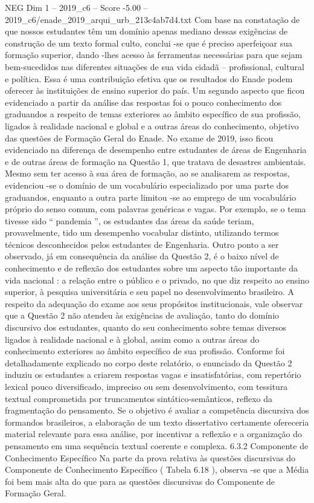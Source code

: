 \begin{textsample}{NEG Dim 1 – 2019\_c6 – Score -5.00 – 2019\_c6/enade\_2019\_arqui\_urb\_213c4ab7d4.txt}
Com base na constatação de que nossos estudantes têm um domínio apenas mediano dessas exigências de construção de um texto formal culto, conclui -se que é preciso aperfeiçoar sua formação superior, dando -lhes acesso às ferramentas necessárias para que sejam bem-sucedidos nas diferentes situações de sua vida cidadã – profissional, cultural e política.
Essa é uma contribuição efetiva que os resultados do Enade podem oferecer às instituições de ensino superior do país.
Um segundo aspecto que ficou evidenciado a partir da análise das respostas foi o pouco conhecimento dos graduandos a respeito de temas exteriores ao âmbito específico de sua profissão, ligados à realidade nacional e global e a outras áreas do conhecimento, objetivo das questões de Formação Geral do Enade.
No exame de 2019, isso ficou evidenciado na diferença de desempenho entre estudantes de áreas de Engenharia e de outras áreas de formação na Questão 1, que tratava de desastres ambientais.
Mesmo sem ter acesso à sua área de formação, ao se analisarem as respostas, evidenciou -se o domínio de um vocabulário especializado por uma parte dos graduandos, enquanto a outra parte limitou -se ao emprego de um vocabulário próprio do senso comum, com palavras genéricas e vagas.
Por exemplo, se o tema tivesse sido “ pandemia ”, os estudantes das áreas da saúde teriam, provavelmente, tido um desempenho vocabular distinto, utilizando termos técnicos desconhecidos pelos estudantes de Engenharia.
Outro ponto a ser observado, já em consequência da análise da Questão 2, é o baixo nível de conhecimento e de reflexão dos estudantes sobre um aspecto tão importante da vida nacional : a relação entre o público e o privado, no que diz respeito ao ensino superior, à pesquisa universitária e seu papel no desenvolvimento brasileiro.
A respeito da adequação do exame aos seus propósitos institucionais, vale observar que a Questão 2 não atendeu às exigências de avaliação, tanto do domínio discursivo dos estudantes, quanto do seu conhecimento sobre temas diversos ligados à realidade nacional e à global, assim como a outras áreas do conhecimento exteriores ao âmbito específico de sua profissão.
Conforme foi detalhadamente explicado no corpo deste relatório, o enunciado da Questão 2 induziu os estudantes a criarem respostas vagas e insatisfatórias, com repertório lexical pouco diversificado, impreciso ou sem desenvolvimento, com tessitura textual comprometida por truncamentos sintático-semânticos, reflexo da fragmentação do pensamento.
Se o objetivo é avaliar a competência discursiva dos formandos brasileiros, a elaboração de um texto dissertativo certamente ofereceria material relevante para essa análise, por incentivar a reflexão e a organização do pensamento em uma sequência textual coerente e complexa. 6.3.2 Componente de Conhecimento Específico Na parte da prova relativa às questões discursivas do Componente de Conhecimento Específico ( Tabela 6.18 ), observa -se que a Média foi bem mais alta do que para as questões discursivas do Componente de Formação Geral.

\end{textsample}
